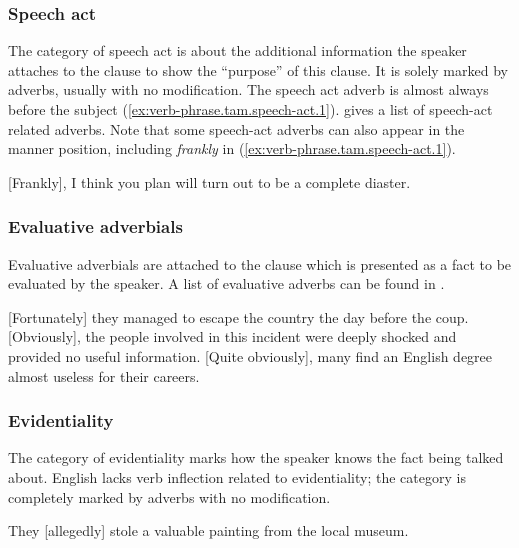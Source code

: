 \documentclass[UTF8, a4paper, oneside, scheme=plain, 12pt]{ctexbook}
\newcommand*{\citesec}[1]{\S~{#1}}
\newcommand*{\citechap}[1]{Ch.~{#1}}
\newcommand*{\citepage}[1]{p.~{#1}}
\newcommand{\form}[1]{\emph{#1}}
\begin{document}
\subsubsection{Speech act}

The category of speech act 
is about the additional information the speaker attaches to the clause 
to show the ``purpose'' of this clause.
It is solely marked by adverbs,
usually with no modification.
The speech act adverb is almost always before the subject
(\ref{ex:verb-phrase.tam.speech-act.1}).
\citet[\citechap{8}, \citesec{18}]{cgel} gives a list of speech-act related adverbs.
Note that some speech-act adverbs 
can also appear in the manner position,
including \form{frankly} in (\ref{ex:verb-phrase.tam.speech-act.1}).

\begin{exe}
    \ex\label{ex:verb-phrase.tam.speech-act.1}  {} [Frankly], I think you plan will turn out to be a complete diaster. 
\end{exe}

\subsubsection{Evaluative adverbials}

Evaluative adverbials are attached to the clause 
which is presented as a fact to be evaluated by the speaker.
A list of evaluative adverbs can be found in \citet[\citepage{771}, {[2]}]{cgel}.

\begin{exe}
    \ex {} [Fortunately] they managed to escape the country the day before the coup.
    \ex {} [Obviously], the people involved in this incident were deeply shocked and 
    provided no useful information.
    \ex {} [Quite obviously], many find an English degree almost useless for their careers. 
\end{exe}

\subsubsection{Evidentiality}

The category of evidentiality marks how the speaker knows the fact being talked about.
English lacks verb inflection related to evidentiality;
the category is completely marked by adverbs with no modification. 

\begin{exe}
    \ex They [allegedly] stole a valuable painting from the local museum.
\end{exe}
\end{document}
